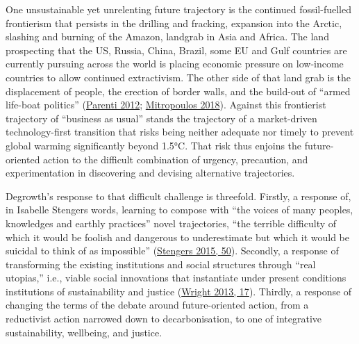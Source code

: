 \documentclass[a4paper, nobind]{templates/ociamthesis}
\begin{document}
One unsustainable yet unrelenting future trajectory is the continued fossil-fuelled frontierism that persists in the drilling and fracking, expansion into the Arctic, slashing and burning of the Amazon, landgrab in Asia and Africa. The land prospecting that the US, Russia, China, Brazil, some EU and Gulf countries are currently pursuing across the world is placing economic pressure on low-income countries to allow continued extractivism. The other side of that land grab is the displacement of people, the erection of border walls, and the build-out of ``armed life-boat politics'' (\protect\hyperlink{ref-parenti_tropic_2012}{Parenti 2012}; \protect\hyperlink{ref-mitropoulos_lifeboat_2018}{Mitropoulos 2018}). Against this frontierist trajectory of ``business as usual'' stands the trajectory of a market-driven technology-first transition that risks being neither adequate nor timely to prevent global warming significantly beyond 1.5°C. That risk thus enjoins the future-oriented action to the difficult combination of urgency, precaution, and experimentation in discovering and devising alternative trajectories.

Degrowth's response to that difficult challenge is threefold. Firstly, a response of, in Isabelle Stengers words, learning to compose with ``the voices of many peoples, knowledges and earthly practices'' novel trajectories, ``the terrible difficulty of which it would be foolish and dangerous to underestimate but which it would be suicidal to think of as impossible'' (\protect\hyperlink{ref-stengers_catastrophic_2015}{Stengers 2015, 50}). Secondly, a response of transforming the existing institutions and social structures through ``real utopias,'' i.e., viable social innovations that instantiate under present conditions institutions of sustainability and justice (\protect\hyperlink{ref-wright_transforming_2013}{Wright 2013, 17}). Thirdly, a response of changing the terms of the debate around future-oriented action, from a reductivist action narrowed down to decarbonisation, to one of integrative sustainability, wellbeing, and justice.
\end{document}
